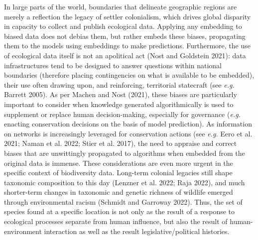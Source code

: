 \documentclass[
  letterpaper,
  DIV=11,
  numbers=noendperiod]{scrartcl}
\begin{document}
\begin{tcolorbox}[enhanced jigsaw, colbacktitle=quarto-callout-note-color!10!white, title=\textcolor{quarto-callout-note-color}{\faInfo}\hspace{0.5em}{Box 2 - Minding legacies shaping ecological datasets}, colback=white, rightrule=.15mm, coltitle=black, colframe=quarto-callout-note-color-frame, bottomrule=.15mm, opacityback=0, breakable, bottomtitle=1mm, titlerule=0mm, toptitle=1mm, arc=.35mm, toprule=.15mm, leftrule=.75mm, left=2mm, opacitybacktitle=0.6]

In large parts of the world, boundaries that delineate geographic
regions are merely a reflection the legacy of settler colonialism, which
drives global disparity in capacity to collect and publish ecological
data. Applying any embedding to biased data does not debias them, but
rather embeds these biases, propagating them to the models using
embeddings to make predictions. Furthermore, the use of ecological data
itself is not an apolitical act (Nost and Goldstein 2021): data
infrastructures tend to be designed to answer questions within national
boundaries (therefore placing contingencies on what is available to be
embedded), their use often drawing upon, and reinforcing, territorial
statecraft (see \emph{e.g.} Barrett 2005). As per Machen and Nost
(2021), these biases are particularly important to consider when
knowledge generated algorithmically is used to supplement or replace
human decision-making, especially for governance (\emph{e.g.} enacting
conservation decisions on the basis of model prediction). As information
on networks is increasingly leveraged for conservation actions (see
\emph{e.g.} Eero et al. 2021; Naman et al. 2022; Stier et al. 2017), the
need to appraise and correct biases that are unwittingly propagated to
algorithms when embedded from the original data is immense. These
considerations are even more urgent in the specific context of
biodiversity data. Long-term colonial legacies still shape taxonomic
composition to this day (Lenzner et al. 2022; Raja 2022), and much
shorter-term changes in taxonomic and genetic richness of wildlife
emerged through environmental racism (Schmidt and Garroway 2022). Thus,
the set of species found at a specific location is not only as the
result of a response to ecological processes separate from human
influence, but also the result of human-environment interaction as well
as the result legislative/political histories.

\end{tcolorbox}
\end{document}
